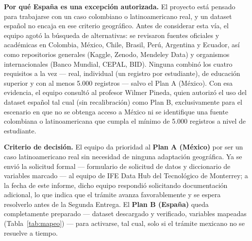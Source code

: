 \documentclass[11pt,a4paper]{article}
\begin{document}
\textbf{Por qué España es una excepción autorizada.} El proyecto está pensado para trabajarse con un caso colombiano o latinoamericano real, y un dataset español no encaja en ese criterio geográfico. Antes de considerar esta vía, el equipo agotó la búsqueda de alternativas: se revisaron fuentes oficiales y académicas en Colombia, México, Chile, Brasil, Perú, Argentina y Ecuador, así como repositorios generales (Kaggle, Zenodo, Mendeley Data) y organismos internacionales (Banco Mundial, CEPAL, BID). Ninguna combinó los cuatro requisitos a la vez --- real, individual (un registro por estudiante), de educación superior y con al menos 5.000 registros --- salvo el Plan A (México). Con esa evidencia, el equipo consultó al profesor Wilmer Pineda, quien autorizó el uso del dataset español tal cual (sin recalibración) como Plan B, exclusivamente para el escenario en que no se obtenga acceso a México ni se identifique una fuente colombiana o latinoamericana que cumpla el mínimo de 5.000 registros a nivel de estudiante.

\textbf{Criterio de decisión.} El equipo da prioridad al \textbf{Plan A (México)} por ser un caso latinoamericano real sin necesidad de ninguna adaptación geográfica. Ya se envió la solicitud formal --- formulario de solicitud de datos y diccionario de variables marcado --- al equipo de IFE Data Hub del Tecnológico de Monterrey; a la fecha de este informe, dicho equipo respondió solicitando documentación adicional, lo que indica que el trámite avanza favorablemente y se espera resolverlo antes de la Segunda Entrega. El \textbf{Plan B (España)} queda completamente preparado --- dataset descargado y verificado, variables mapeadas (Tabla~\ref{tab:mapeo}) --- para activarse, tal cual, solo si el trámite mexicano no se resuelve a tiempo.
\end{document}
